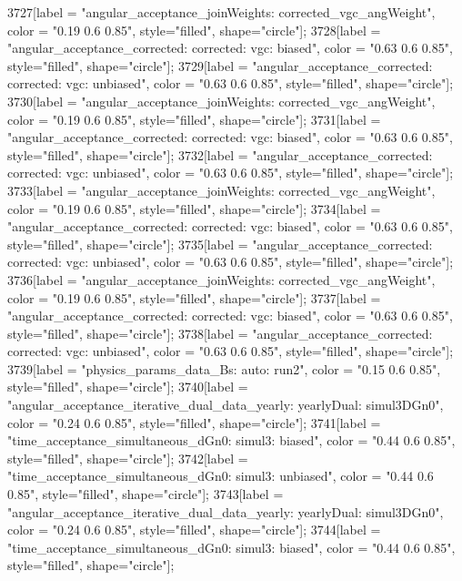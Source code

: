 {	3727[label = "angular_acceptance_joinWeights\nwflag: corrected_vgc_angWeight", color = "0.19 0.6 0.85", style="filled", shape="circle"];
	3728[label = "angular_acceptance_corrected\nangacc: corrected\ncsp: vgc\ntrigger: biased", color = "0.63 0.6 0.85", style="filled", shape="circle"];
	3729[label = "angular_acceptance_corrected\nangacc: corrected\ncsp: vgc\ntrigger: unbiased", color = "0.63 0.6 0.85", style="filled", shape="circle"];
	3730[label = "angular_acceptance_joinWeights\nwflag: corrected_vgc_angWeight", color = "0.19 0.6 0.85", style="filled", shape="circle"];
	3731[label = "angular_acceptance_corrected\nangacc: corrected\ncsp: vgc\ntrigger: biased", color = "0.63 0.6 0.85", style="filled", shape="circle"];
	3732[label = "angular_acceptance_corrected\nangacc: corrected\ncsp: vgc\ntrigger: unbiased", color = "0.63 0.6 0.85", style="filled", shape="circle"];
	3733[label = "angular_acceptance_joinWeights\nwflag: corrected_vgc_angWeight", color = "0.19 0.6 0.85", style="filled", shape="circle"];
	3734[label = "angular_acceptance_corrected\nangacc: corrected\ncsp: vgc\ntrigger: biased", color = "0.63 0.6 0.85", style="filled", shape="circle"];
	3735[label = "angular_acceptance_corrected\nangacc: corrected\ncsp: vgc\ntrigger: unbiased", color = "0.63 0.6 0.85", style="filled", shape="circle"];
	3736[label = "angular_acceptance_joinWeights\nwflag: corrected_vgc_angWeight", color = "0.19 0.6 0.85", style="filled", shape="circle"];
	3737[label = "angular_acceptance_corrected\nangacc: corrected\ncsp: vgc\ntrigger: biased", color = "0.63 0.6 0.85", style="filled", shape="circle"];
	3738[label = "angular_acceptance_corrected\nangacc: corrected\ncsp: vgc\ntrigger: unbiased", color = "0.63 0.6 0.85", style="filled", shape="circle"];
	3739[label = "physics_params_data_Bs\nfit: auto\nyear: run2", color = "0.15 0.6 0.85", style="filled", shape="circle"];
	3740[label = "angular_acceptance_iterative_dual_data_yearly\nangacc: yearlyDual\ntimeacc: simul3DGn0", color = "0.24 0.6 0.85", style="filled", shape="circle"];
	3741[label = "time_acceptance_simultaneous_dGn0\ntimeacc: simul3\ntrigger: biased", color = "0.44 0.6 0.85", style="filled", shape="circle"];
	3742[label = "time_acceptance_simultaneous_dGn0\ntimeacc: simul3\ntrigger: unbiased", color = "0.44 0.6 0.85", style="filled", shape="circle"];
	3743[label = "angular_acceptance_iterative_dual_data_yearly\nangacc: yearlyDual\ntimeacc: simul3DGn0", color = "0.24 0.6 0.85", style="filled", shape="circle"];
	3744[label = "time_acceptance_simultaneous_dGn0\ntimeacc: simul3\ntrigger: biased", color = "0.44 0.6 0.85", style="filled", shape="circle"];
}
